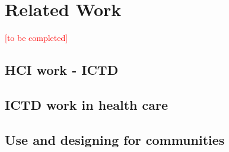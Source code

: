 \section{Related Work}
\textcolor{red}{[to be completed]} 
\subsection{HCI work - ICTD}
\subsection{ICTD work in health care}
\subsection{Use and designing for communities}
